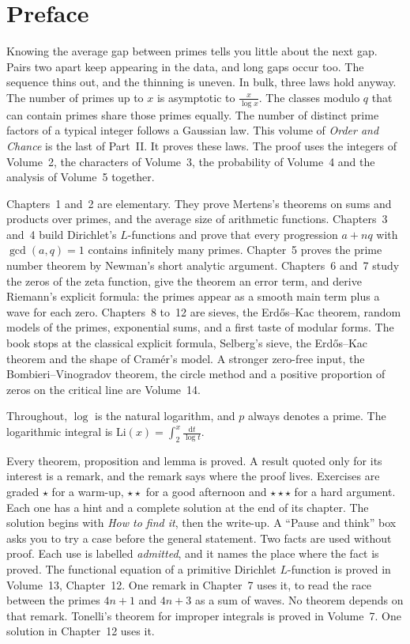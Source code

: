 \chapter*{Preface}
Knowing the average gap between primes tells you little about the next gap. Pairs two apart keep appearing in the data, and long gaps occur too. The sequence thins out, and the thinning is uneven. In bulk, three laws hold anyway. The number of primes up to $x$ is asymptotic to $\frac x{\log x}$. The classes modulo $q$ that can contain primes share those primes equally. The number of distinct prime factors of a typical integer follows a Gaussian law. This volume of \emph{Order and Chance} is the last of Part~II. It proves these laws. The proof uses the integers of Volume~2, the characters of Volume~3, the probability of Volume~4 and the analysis of Volume~5 together.

Chapters~1 and~2 are elementary. They prove Mertens's theorems on sums and products over primes, and the average size of arithmetic functions. Chapters~3 and~4 build Dirichlet's $L$-functions and prove that every progression $a+nq$ with $\gcd(a,q)=1$ contains infinitely many primes. Chapter~5 proves the prime number theorem by Newman's short analytic argument. Chapters~6 and~7 study the zeros of the zeta function, give the theorem an error term, and derive Riemann's explicit formula: the primes appear as a smooth main term plus a wave for each zero. Chapters~8 to~12 are sieves, the Erd\H{o}s--Kac theorem, random models of the primes, exponential sums, and a first taste of modular forms. The book stops at the classical explicit formula, Selberg's sieve, the Erd\H{o}s--Kac theorem and the shape of Cramér's model. A stronger zero-free input, the Bombieri--Vinogradov theorem, the circle method and a positive proportion of zeros on the critical line are Volume~14.

Throughout, $\log$ is the natural logarithm, and $p$ always denotes a prime. The logarithmic integral is $\mathrm{Li}(x)=\int_2^x\frac{\mathrm dt}{\log t}$.

Every theorem, proposition and lemma is proved. A result quoted only for its interest is a remark, and the remark says where the proof lives. Exercises are graded \textbf{$\star$} for a warm-up, \textbf{$\star\star$} for a good afternoon and \textbf{$\star\star\star$} for a hard argument. Each one has a hint and a complete solution at the end of its chapter. The solution begins with \emph{How to find it}, then the write-up. A ``Pause and think'' box asks you to try a case before the general statement. Two facts are used without proof. Each use is labelled \emph{admitted}, and it names the place where the fact is proved. The functional equation of a primitive Dirichlet $L$-function is proved in Volume~13, Chapter~12. One remark in Chapter~7 uses it, to read the race between the primes $4n+1$ and $4n+3$ as a sum of waves. No theorem depends on that remark. Tonelli's theorem for improper integrals is proved in Volume~7. One solution in Chapter~12 uses it.

